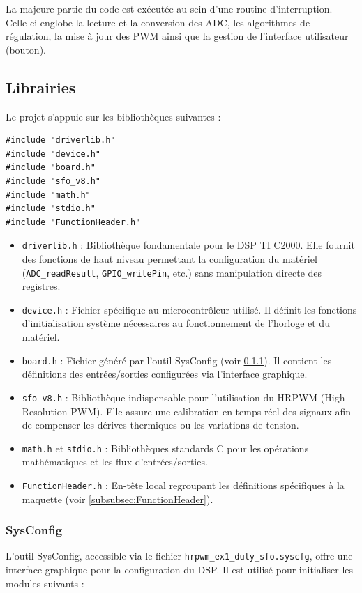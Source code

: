 La majeure partie du code est exécutée au sein d'une routine d'interruption. Celle-ci englobe la lecture et la conversion des ADC, les algorithmes de régulation, la mise à jour des PWM ainsi que la gestion de l'interface utilisateur (bouton).

\subsection{Librairies}
Le projet s'appuie sur les bibliothèques suivantes :

\begin{verbatim}
#include "driverlib.h"
#include "device.h"
#include "board.h"
#include "sfo_v8.h"
#include "math.h"
#include "stdio.h"
#include "FunctionHeader.h"
\end{verbatim}

\begin{itemize}
    \item \texttt{driverlib.h} : Bibliothèque fondamentale pour le DSP TI C2000. Elle fournit des fonctions de haut niveau permettant la configuration du matériel (\texttt{ADC\_readResult}, \texttt{GPIO\_writePin}, etc.) sans manipulation directe des registres.
    \item \texttt{device.h} : Fichier spécifique au microcontrôleur utilisé. Il définit les fonctions d'initialisation système nécessaires au fonctionnement de l'horloge et du matériel.
    \item \texttt{board.h} : Fichier généré par l'outil SysConfig (voir \ref{subsubsec:SysConfig}). Il contient les définitions des entrées/sorties configurées via l'interface graphique.
    \item \texttt{sfo\_v8.h} : Bibliothèque indispensable pour l'utilisation du HRPWM (High-Resolution PWM). Elle assure une calibration en temps réel des signaux afin de compenser les dérives thermiques ou les variations de tension.
    \item \texttt{math.h} et \texttt{stdio.h} : Bibliothèques standards C pour les opérations mathématiques et les flux d'entrées/sorties.
    \item \texttt{FunctionHeader.h} : En-tête local regroupant les définitions spécifiques à la maquette (voir \ref{subsubsec:FunctionHeader}).
\end{itemize}

\subsubsection{SysConfig}
\label{subsubsec:SysConfig}
L'outil SysConfig, accessible via le fichier \texttt{hrpwm\_ex1\_duty\_sfo.syscfg}, offre une interface graphique pour la configuration du DSP. Il est utilisé pour initialiser les modules suivants :

